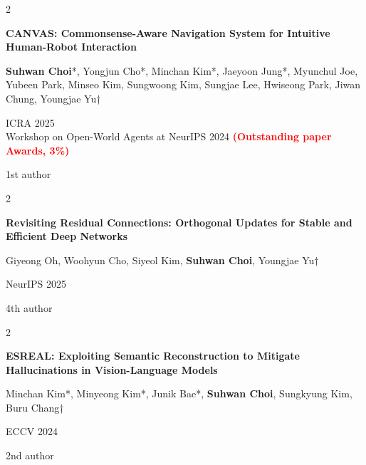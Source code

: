 \documentclass[10pt, letterpaper]{article}
\newenvironment{twocolentry}[2][]{
    \onecolentry
    \def\secondColumn{#2}
    \setcolumnwidth{\fill, 4.5 cm}
    \begin{paracol}{2}
}{
    \switchcolumn \raggedleft \secondColumn
    \end{paracol}
    \endonecolentry
} %
\let\hrefWithoutArrow\href
\renewcommand{\href}[2]{\hrefWithoutArrow{#1}{\ifthenelse{\equal{#2}{}}{ }{#2 }\raisebox{.15ex}{\footnotesize \faExternalLink*}}}
\begin{document}
\vspace{0.2 cm}

\begin{samepage}
    \begin{twocolentry}{
            1st author
        }
        \textbf{CANVAS: Commonsense-Aware Navigation System for Intuitive Human-Robot Interaction} \href{https://worv-ai.github.io/canvas/}{[Website]}

        \vspace{0.10 cm}

        \small \textbf{Suhwan Choi}*, Yongjun Cho*, Minchan Kim*, Jaeyoon Jung*, Myunchul Joe, Yubeen Park, Minseo Kim, Sungwoong Kim, Sungjae Lee, Hwiseong Park, Jiwan Chung, Youngjae Yu†

        \vspace{0.10 cm}

        ICRA 2025 \\
        Workshop on Open-World Agents at NeurIPS 2024 \textcolor{red}{\textbf{(Outstanding paper Awards, 3\%)}}
    \end{twocolentry}
\end{samepage}

\vspace{0.2 cm}

\begin{samepage}
    \begin{twocolentry}{
            4th author
        }
        \textbf{Revisiting Residual Connections: Orthogonal Updates for Stable and Efficient Deep Networks}

        \vspace{0.10 cm}

        \small Giyeong Oh, Woohyun Cho, Siyeol Kim, \textbf{Suhwan Choi}, Youngjae Yu†

        \vspace{0.10 cm}

        NeurIPS 2025
    \end{twocolentry}
\end{samepage}

\vspace{0.2 cm}

\begin{samepage}
    \begin{twocolentry}{
            2nd author
        }
        \textbf{ESREAL: Exploiting Semantic Reconstruction to Mitigate Hallucinations in Vision-Language Models}

        \vspace{0.10 cm}

        \small Minchan Kim*, Minyeong Kim*, Junik Bae*, \textbf{Suhwan Choi}, Sungkyung Kim, Buru Chang†

        \vspace{0.10 cm}

        ECCV 2024
    \end{twocolentry}
\end{samepage}
\end{document}
